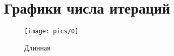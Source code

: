 \section{Графики числа итераций}
\begin{figure}[H]
    \centering
    \texttt{[image: pics/0]}
    \caption[Короткая]{Длинная}
    \label{fig:0}
\end{figure}
